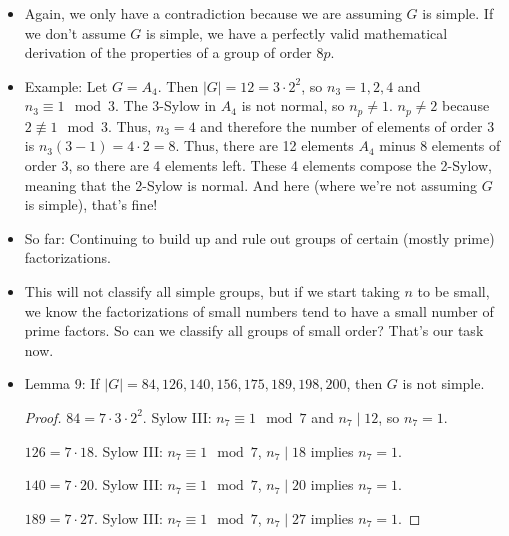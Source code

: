 \documentclass[../notes.tex]{subfiles}
\begin{document}
\begin{itemize}
\begin{proof}
        First case: $n_p=8$ and $n_p\equiv 1\mod p$. We must have $p=7$. Thus $|G|=8\cdot 7=56$. That's all we can get from the $p$-Sylow; now let's look at the 2-Sylow ($2^3=8$). $n_2=1,7$. We apply the $pqr$ too-many-elements style again. Number of elements of order 7 is $n_7(7-1)=8\cdot 6=48$. We have a group of 56 elements and 48 of them have order 7. So what's left? There are 8 elements left. But we know that the 2-Sylow has order 8, so let $P=G\setminus\{g\in G\mid |g|=7\}$. Then $|P|=8$. This implies that there is only one 2-Sylow, so $n_2=1$, meaning that the 2-Sylow is normal and giving us a contradiction.
    \end{proof}
    \item Again, we only have a contradiction because we are assuming $G$ is simple. If we don't assume $G$ is simple, we have a perfectly valid mathematical derivation of the properties of a group of order $8p$.
    \item Example: Let $G=A_4$. Then $|G|=12=3\cdot 2^2$, so $n_3=1,2,4$ and $n_3\equiv 1\mod 3$. The 3-Sylow in $A_4$ is not normal, so $n_p\neq 1$. $n_p\neq 2$ because $2\not\equiv 1\mod 3$. Thus, $n_3=4$ and therefore the number of elements of order 3 is $n_3(3-1)=4\cdot 2=8$. Thus, there are 12 elements $A_4$ minus 8 elements of order 3, so there are 4 elements left. These 4 elements compose the 2-Sylow, meaning that the 2-Sylow is normal. And here (where we're not assuming $G$ is simple), that's fine!
    \item So far: Continuing to build up and rule out groups of certain (mostly prime) factorizations.
    \item This will not classify all simple groups, but if we start taking $n$ to be small, we know the factorizations of small numbers tend to have a small number of prime factors. So can we classify all groups of small order? That's our task now.
    \item Lemma 9: If $|G|=84,126,140,156,175,189,198,200$, then $G$ is not simple.
    \begin{proof}
        $84=7\cdot 3\cdot 2^2$. Sylow III: $n_7\equiv 1\mod 7$ and $n_7\mid 12$, so $n_7=1$.\par
        $126=7\cdot 18$. Sylow III: $n_7\equiv 1\mod 7$, $n_7\mid 18$ implies $n_7=1$.\par
        $140=7\cdot 20$. Sylow III: $n_7\equiv 1\mod 7$, $n_7\mid 20$ implies $n_7=1$.\par
        $189=7\cdot 27$. Sylow III: $n_7\equiv 1\mod 7$, $n_7\mid 27$ implies $n_7=1$.\par\smallskip

\end{proof}
\end{itemize}
\end{document}
